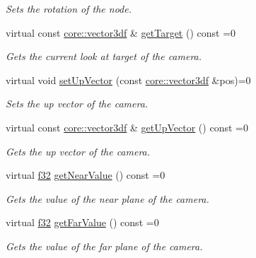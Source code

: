 \begin{DoxyCompactItemize}
\begin{DoxyCompactList}\small\item\em Sets the rotation of the node. \end{DoxyCompactList}\item 
virtual const \hyperlink{namespaceirr_1_1core_a06f169d08b5c429f5575acb7edbad811}{core\+::vector3df} \& \hyperlink{classirr_1_1scene_1_1ICameraSceneNode_a3ce50433986650eea15b20e4ed19c952}{get\+Target} () const =0
\begin{DoxyCompactList}\small\item\em Gets the current look at target of the camera. \end{DoxyCompactList}\item 
virtual void \hyperlink{classirr_1_1scene_1_1ICameraSceneNode_a1e74c17d89979fde4738276ccdcc0d3a}{set\+Up\+Vector} (const \hyperlink{namespaceirr_1_1core_a06f169d08b5c429f5575acb7edbad811}{core\+::vector3df} \&pos)=0
\begin{DoxyCompactList}\small\item\em Sets the up vector of the camera. \end{DoxyCompactList}\item 
virtual const \hyperlink{namespaceirr_1_1core_a06f169d08b5c429f5575acb7edbad811}{core\+::vector3df} \& \hyperlink{classirr_1_1scene_1_1ICameraSceneNode_a0dfb97859302021b9a44f2ead59fa230}{get\+Up\+Vector} () const =0
\begin{DoxyCompactList}\small\item\em Gets the up vector of the camera. \end{DoxyCompactList}\item 
virtual \hyperlink{namespaceirr_a0277be98d67dc26ff93b1a6a1d086b07}{f32} \hyperlink{classirr_1_1scene_1_1ICameraSceneNode_aee5dfccee2ec0b0cbcdb1079a6430a25}{get\+Near\+Value} () const =0
\begin{DoxyCompactList}\small\item\em Gets the value of the near plane of the camera. \end{DoxyCompactList}\item 
virtual \hyperlink{namespaceirr_a0277be98d67dc26ff93b1a6a1d086b07}{f32} \hyperlink{classirr_1_1scene_1_1ICameraSceneNode_a7a6603b808522605276359b834d48245}{get\+Far\+Value} () const =0
\begin{DoxyCompactList}\small\item\em Gets the value of the far plane of the camera. \end{DoxyCompactList}\item 

\end{DoxyCompactItemize}
